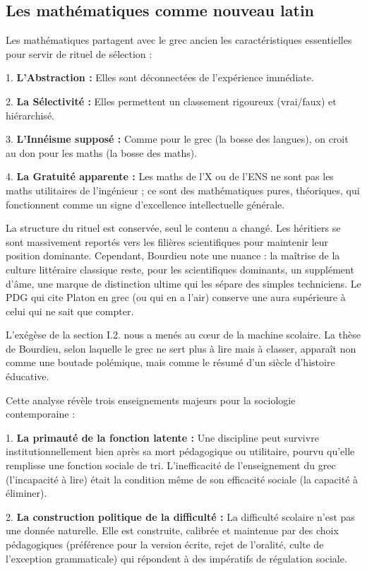 \subsection{Les mathématiques comme nouveau latin}

Les mathématiques partagent avec le grec ancien les caractéristiques essentielles pour servir de
rituel de sélection :

1. \textbf{L'Abstraction :} Elles sont déconnectées de l'expérience immédiate.

2. \textbf{La Sélectivité :} Elles permettent un classement rigoureux (vrai/faux) et hiérarchisé.

3. \textbf{L'Innéisme supposé :} Comme pour le grec (\og la bosse des langues\fg{}), on croit au \og
don\fg{} pour les maths (\og la bosse des maths\fg{}).

4. \textbf{La Gratuité apparente :} Les maths de l'X ou de l'ENS ne sont pas les maths utilitaires
de l'ingénieur ; ce sont des mathématiques pures, théoriques, qui fonctionnent comme un signe
d'excellence intellectuelle générale.\cite{I-2-3-ref1}

La structure du rituel est conservée, seul le contenu a changé. Les \og héritiers\fg{} se sont
massivement reportés vers les filières scientifiques pour maintenir leur position dominante.
Cependant, Bourdieu note une nuance : la maîtrise de la culture littéraire classique reste, pour les
scientifiques dominants, un \og supplément d'âme\fg{}, une marque de distinction ultime qui les
sépare des simples techniciens. Le PDG qui cite Platon en grec (ou qui en a l'air) conserve une aura
supérieure à celui qui ne sait que compter.\cite{I-2-3-ref7}

L'exégèse de la section I.2.\cite{I-2-3-ref3} nous a menés au cœur de la machine scolaire. La thèse
de Bourdieu, selon laquelle \og le grec ne sert plus à lire mais à classer\fg{}, apparaît non comme
une boutade polémique, mais comme le résumé d'un siècle d'histoire éducative.

Cette analyse révèle trois enseignements majeurs pour la sociologie contemporaine :

1. \textbf{La primauté de la fonction latente :} Une discipline peut survivre institutionnellement
bien après sa mort pédagogique ou utilitaire, pourvu qu'elle remplisse une fonction sociale de tri.
L'inefficacité de l'enseignement du grec (l'incapacité à lire) était la condition même de son
efficacité sociale (la capacité à éliminer).

2. \textbf{La construction politique de la difficulté :} La difficulté scolaire n'est pas une donnée
naturelle. Elle est construite, calibrée et maintenue par des choix pédagogiques (préférence pour la
version écrite, rejet de l'oralité, culte de l'exception grammaticale) qui répondent à des
impératifs de régulation sociale.

